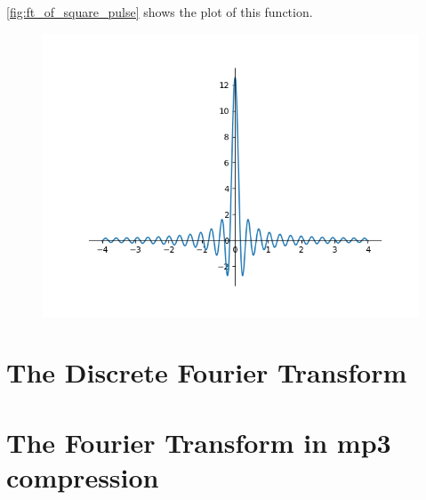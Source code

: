 \documentclass [12pt, titlepage]{article}
\numberwithin{equation}{section}
\let\oldsection\section
\renewcommand\section{\clearpage\oldsection}
\begin{document}
\autoref{fig:ft_of_square_pulse} shows the plot of this function.
\begin{figure}[H]
    \centering
    \includegraphics[width=.5\textwidth]{ft_of_square_pulse}
    \caption{}
    \label{fig:ft_of_square_pulse}
\end{figure}


\section{The Discrete Fourier Transform}
\section{The Fourier Transform in mp3 compression}



\printbibliography
\end{document}
